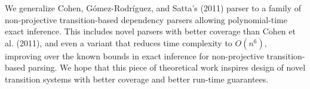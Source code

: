 We generalize Cohen, Gómez-Rodríguez, and Satta's (2011) parser to a family of non-projective transition-based dependency parsers allowing polynomial-time exact inference. This includes novel parsers with better coverage than Cohen et al. (2011), and even a variant that reduces time complexity to $O(n^6)$, improving over the known bounds in exact inference for non-projective transition-based parsing. We hope that this piece of theoretical work inspires design of novel transition systems with better coverage and better run-time guarantees.
